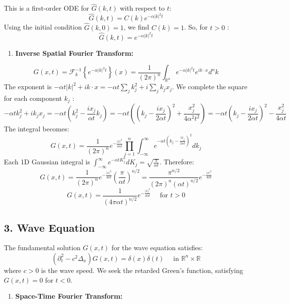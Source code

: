 This is a first-order ODE for $\widehat{G}(k, t)$ with respect to $t$:
\[
\widehat{G}(k, t)=C(k) e^{-\alpha|k|^2 t}
\]
Using the initial condition $\widehat{G}(k, 0)=1$, we find $C(k)=1$. So, for $t>0$ :
\[
\widehat{G}(k, t)=e^{-\alpha|k|^2 t}
\]
\begin{enumerate}
	\item \textbf{Inverse Spatial Fourier Transform:}
\end{enumerate}
\[
G(x, t)=\mathcal{F}_k^{-1}\left\{e^{-\alpha|k|^2 t}\right\}(x)=\frac{1}{(2 \pi)^n} \int_{\mathbb{R}^n} e^{-\alpha|k|^2 t} e^{i k \cdot x} d^n k
\]
The exponent is $-\alpha t|k|^2+i k \cdot x=-\alpha t \sum_j k_j^2+i \sum_j k_j x_j$.
We complete the square for each component $k_j$ :
\[
-\alpha t k_j^2+i k_j x_j=-\alpha t\left(k_j^2-\frac{i x_j}{\alpha t} k_j\right)=-\alpha t\left(\left(k_j-\frac{i x_j}{2 \alpha t}\right)^2+\frac{x_j^2}{4 \alpha^2 t^2}\right)=-\alpha t\left(k_j-\frac{i x_j}{2 \alpha t}\right)^2-\frac{x_j^2}{4 \alpha t}
\]
The integral becomes:
\[
G(x, t)=\frac{1}{(2 \pi)^n} e^{-\frac{|x|^2}{4 \alpha t}} \prod_{j=1}^n \int_{-\infty}^\infty e^{-\alpha t\left(k_j-\frac{i x_j}{2 \alpha t}\right)^2} d k_j
\]
Each 1D Gaussian integral is $\int_{-\infty}^\infty e^{-\alpha t K_j^2} d K_j=\sqrt{\frac{\pi}{\alpha t}}$.
Therefore:
\[
G(x, t)=\frac{1}{(2 \pi)^n} e^{-\frac{|x|^2}{4 \alpha t}}\left(\frac{\pi}{\alpha t}\right)^{n / 2}=\frac{\pi^{n / 2}}{(2 \pi)^n(\alpha t)^{n / 2}} e^{-\frac{|x|^2}{4 \alpha t}}
\]
\[
G(x, t)=\frac{1}{(4 \pi \alpha t)^{n / 2}} e^{-\frac{|x|^2}{4 \alpha t}} \quad \text { for } t>0
\]

\subsection{3. Wave Equation}

The fundamental solution $G(x, t)$ for the wave equation satisfies:
\[
\left(\partial_t^2-c^2 \Delta_x\right) G(x, t)=\delta(x) \delta(t) \quad \text { in } \mathbb{R}^n \times \mathbb{R}
\]
where $c>0$ is the wave speed. We seek the retarded Green's function, satisfying $G(x, t)=0$ for $t<0$.

\begin{enumerate}
	\item \textbf{Space-Time Fourier Transform:}
\end{enumerate}

